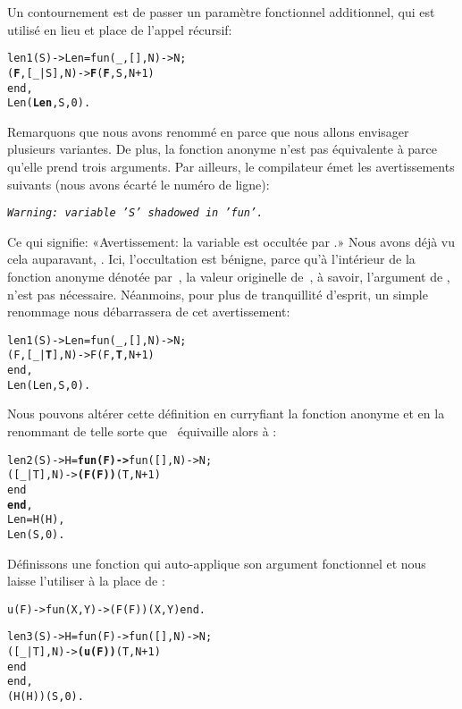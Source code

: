 Un contournement est de passer un paramètre fonctionnel additionnel,
qui est utilisé en lieu et place de l'appel récursif:
\begin{alltt}
len1(S) -> Len = fun(_,   [],N) -> N;
                    (\textbf{F},[\_|S],N) -> \textbf{F}(\textbf{F},S,N+1)
                 end,
           Len(\textbf{Len},S,0).
\end{alltt}
Remarquons que nous avons renommé  en 
parce que nous allons envisager plusieurs variantes. De plus, la
fonction anonyme n'est pas équivalente à  parce qu'elle
prend trois arguments. Par ailleurs, le compilateur émet les
avertissements suivants (nous avons écarté le numéro de ligne):
\begin{center}
\emph{\texttt{Warning: variable 'S' shadowed in 'fun'.}}
\end{center}
Ce qui signifie: «Avertissement: la variable  est occultée
par .» Nous avons déjà vu cela auparavant,
. Ici, l'occultation est bénigne, parce qu'à
l'intérieur de la fonction anonyme dénotée par~, la
valeur originelle de~, à savoir, l'argument de
, n'est pas nécessaire. Néanmoins, pour plus de
tranquillité d'esprit, un simple renommage nous débarrassera de cet
avertissement:
\begin{alltt}
len1(S) -> Len = fun(_,   [],N) -> N;
                    (F,[\_|\textbf{T}],N) -> F(F,\textbf{T},N+1)\hfill% \emph{Renommage}
                 end,
           Len(Len,S,0).
\end{alltt}
Nous pouvons altérer cette définition en curryfiant la fonction
anonyme et en la renommant de telle sorte que ~équivaille
alors à :
\begin{alltt}
len2(S) -> H = \textbf{fun(F) ->} fun(   [],N) -> N;
                            ([\_|T],N) -> \textbf{(F(F))}(T,N+1)
                         end
               \textbf{end},
           Len = H(H),\hfill% \emph{Équivaut à} fun len/2
           Len(S,0).
\end{alltt}
Définissons une fonction  qui auto-applique son argument
fonctionnel et nous laisse l'utiliser à la place de :
\begin{alltt}
u(F) -> fun(X,Y) -> (F(F))(X,Y) end.\hfill% \emph{Auto-application}

len3(S) -> H = fun(F) -> fun(   [],N) -> N;
                            ([\_|T],N) -> \textbf{(u(F))}(T,N+1)
                         end
               end,
           (H(H))(S,0).\hfill% Len \emph{expansée}
\end{alltt}
